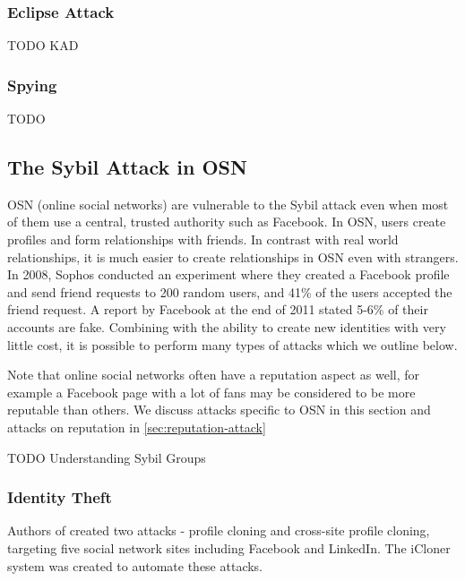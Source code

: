 

\subsubsection{Eclipse Attack}
TODO KAD\cite{steiner2007exploiting}

\subsubsection{Spying}
TODO \cite{holz2008measurements}

\subsection{The Sybil Attack in OSN}
OSN (online social networks) are vulnerable to the Sybil attack even when most
of them use a central, trusted authority such as Facebook. In OSN, users create
profiles and form relationships with friends. In contrast with real world
relationships, it is much easier to create relationships in OSN even with
strangers. In 2008, Sophos conducted an experiment where they created a Facebook
profile and send friend requests to 200 random users, and 41\% of the users
accepted the friend request\cite{sophos}. A report by Facebook at the end of
2011 stated 5-6\% of their accounts are fake\cite{facebookfake}. Combining with
the ability to create new identities with very little cost, it is possible to
perform many types of attacks which we outline below.

Note that online social networks often have a reputation aspect as well, for
example a Facebook page with a lot of fans may be considered to be more
reputable than others. We discuss attacks specific to OSN in this section and
attacks on reputation in \autoref{sec:reputation-attack}

TODO Understanding Sybil Groups\cite{jiang2015understanding}

\subsubsection{Identity Theft}
Authors of \cite{bilge2009all} created two attacks - profile cloning and
cross-site profile cloning, targeting five social network sites including
Facebook and LinkedIn. The iCloner system was created to automate these
attacks.

